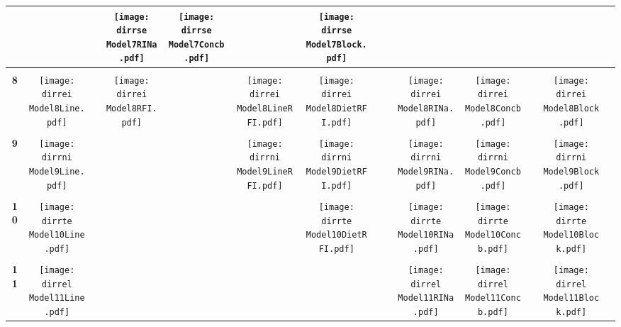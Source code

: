 \documentclass[landscape,a2paper, onecolumn]{paper}
\def \dirrse {/run/user/1000/gvfs/smb-share:server=cyfiles.iastate.edu,share=09/22/ntyet/R/RA/Data/RFI-newdata/result/Model7.Line.Diet.RFI.Concb.RINa.Block.DietRFI.LineRFI/}
\def \dirrei {/run/user/1000/gvfs/smb-share:server=cyfiles.iastate.edu,share=09/22/ntyet/R/RA/Data/RFI-newdata/result/Model8.Line.RFI.Concb.RINa.Block.DietRFI.LineRFI/}
\def \dirrni {/run/user/1000/gvfs/smb-share:server=cyfiles.iastate.edu,share=09/22/ntyet/R/RA/Data/RFI-newdata/result/Model9.Line.Concb.RINa.Block.DietRFI.LineRFI/}
\def \dirrte {/run/user/1000/gvfs/smb-share:server=cyfiles.iastate.edu,share=09/22/ntyet/R/RA/Data/RFI-newdata/result/Model10.Line.Concb.RINa.Block.DietRFI/}
\def \dirrel {/run/user/1000/gvfs/smb-share:server=cyfiles.iastate.edu,share=09/22/ntyet/R/RA/Data/RFI-newdata/result/Model11.Line.Concb.RINa.Block/}
\begin{document}
\begin{table}
\begin{tabular}{cccccccccccccc}
      &
      &
      &\texttt{[image: \\dirrse Model7RINa.pdf]}
      &\texttt{[image: \\dirrse Model7Concb.pdf]}
      &
      &\texttt{[image: \\dirrse Model7Block.pdf]}
      &
     \\[5pt]
     \hline
     \\[5pt]
     {\Huge \textbf{8}} 
      &\texttt{[image: \\dirrei Model8Line.pdf]}
      &
      &\texttt{[image: \\dirrei Model8RFI.pdf]}
      &
      &\texttt{[image: \\dirrei Model8LineRFI.pdf]}
      &\texttt{[image: \\dirrei Model8DietRFI.pdf]}
      &
      &
      &\texttt{[image: \\dirrei Model8RINa.pdf]}
      &\texttt{[image: \\dirrei Model8Concb.pdf]}
      &
      &\texttt{[image: \\dirrei Model8Block.pdf]}
      &
     \\[5pt]
     \hline
     \\[5pt]
     {\Huge \textbf{9}} 
      &\texttt{[image: \\dirrni Model9Line.pdf]}
      &
      &
      &
      &\texttt{[image: \\dirrni Model9LineRFI.pdf]}
      &\texttt{[image: \\dirrni Model9DietRFI.pdf]}
      &
      &
      &\texttt{[image: \\dirrni Model9RINa.pdf]}
      &\texttt{[image: \\dirrni Model9Concb.pdf]}
      &
      &\texttt{[image: \\dirrni Model9Block.pdf]}
      &
     \\[5pt]
     \hline
     \\[5pt]
     {\Huge \textbf{10}} 
      &\texttt{[image: \\dirrte Model10Line.pdf]}
      &
      &
      &
      &
      &\texttt{[image: \\dirrte Model10DietRFI.pdf]}
      &
      &
      &\texttt{[image: \\dirrte Model10RINa.pdf]}
      &\texttt{[image: \\dirrte Model10Concb.pdf]}
      &
      &\texttt{[image: \\dirrte Model10Block.pdf]}
      &
     \\[5pt]
     \hline
     \\[5pt]
     {\Huge \textbf{11}} 
      &\texttt{[image: \\dirrel Model11Line.pdf]}
      &
      &
      &
      &
      &
      &
      &
      &\texttt{[image: \\dirrel Model11RINa.pdf]}
      &\texttt{[image: \\dirrel Model11Concb.pdf]}
      &
      &\texttt{[image: \\dirrel Model11Block.pdf]}
      &
     \\[5pt]
     \hline
\end{tabular}
\end{table}
\end{document}
